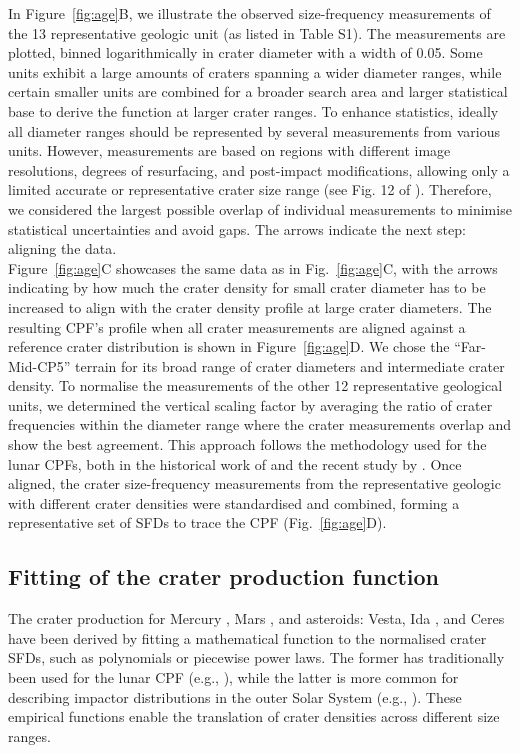 \documentclass[preprint,12pt,3p,times,authoryear]{elsarticle}
\begin{document}
In Figure~\ref{fig:age}B, we illustrate the observed size-frequency measurements of the 13 representative geologic unit (as listed in Table S1). The measurements are plotted, binned logarithmically in crater diameter with a width of 0.05. 
Some units exhibit a large amounts of craters spanning a wider diameter ranges, while certain smaller units are combined for a broader search area and larger statistical base to derive the function at larger crater ranges. To enhance statistics, ideally all diameter ranges should be represented by several measurements from various units. However, measurements are based on regions with different image resolutions, degrees of resurfacing, and post-impact modifications, allowing only a limited accurate or representative crater size range (see Fig. 12 of \citealt{Bland2018}). Therefore, we considered the largest possible overlap of individual measurements to minimise statistical uncertainties and avoid gaps. The arrows indicate the next step: aligning the data.\\

Figure~\ref{fig:age}C showcases the same data as in Fig.~\ref{fig:age}C, with the arrows indicating by how much the crater density for small crater diameter has to be increased to align with the crater density profile at large crater diameters. The resulting CPF's profile when all crater measurements are aligned against a reference crater distribution is shown in Figure~\ref{fig:age}D. We chose the ``Far-Mid-CP5'' terrain for its broad range of crater diameters and intermediate crater density. To normalise the measurements of the other 12 representative geological units, we determined the vertical scaling factor by averaging the ratio of crater frequencies within the diameter range where the crater measurements overlap and show the best agreement. This approach follows the methodology used for the lunar CPFs, both in the historical work of \citet{Neukum1975} and the recent study by \citet{Xiao2024}. Once aligned, the crater size-frequency measurements from the representative geologic with different crater densities were standardised and combined, forming a representative set of SFDs to trace the CPF (Fig.~\ref{fig:age}D).\\

\subsection{Fitting of the crater production function}
\label{subsec:fitting}
The crater production for Mercury \citep{Neukum2001}, Mars \citep{Ivanov2001, Hartmann2005}, and asteroids: Vesta, Ida \citep{Schmedemann2014}, and Ceres \citep{Hiesinger2016} have been derived by fitting a mathematical function to the normalised crater SFDs, such as polynomials or piecewise power laws. The former has traditionally been used for the lunar CPF (e.g., \citealt{Neukum2001}), while the latter is more common for describing impactor distributions in the outer Solar System (e.g., \citealt{Zahnle2003}). These empirical functions enable the translation of crater densities across different size ranges. \\
\end{document}
